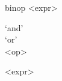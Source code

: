 \documentclass[convert={outext=.png}]{standalone}
\begin{document}
\begin{málrit}{binop}
	<expr>
	\begin{stack}
		`and'\\
		`or'\\
		<op>
	\end{stack}
	<expr>
\end{málrit}
\end{document}
